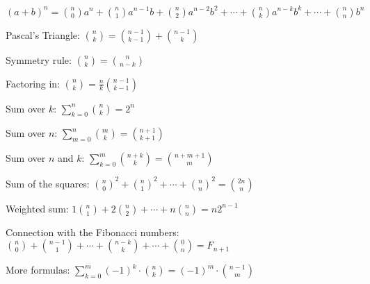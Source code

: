 $ (a+b)^n = \binom n 0 a^n + \binom n 1 a^{n-1} b + \binom n 2 a^{n-2} b^2 + \cdots + \binom n k a^{n-k} b^k + \cdots + \binom n n b^n $ 

Pascal's Triangle:
$ \binom n k = \binom {n-1} {k-1} + \binom {n-1} k $ 

Symmetry rule:
$ \binom n k = \binom n {n-k} $

Factoring in:
$ \binom n k = \frac n k \binom {n-1} {k-1} $

Sum over $k$:
$ \sum_{k = 0}^n \binom n k = 2 ^ n $

Sum over $n$:
$ \sum_{m = 0}^n \binom m k = \binom {n + 1} {k + 1} $

Sum over $n$ and $k$:
$ \sum_{k = 0}^m  \binom {n + k} k = \binom {n + m + 1} m $

Sum of the squares:
$ {\binom n 0}^2 + {\binom n 1}^2 + \cdots + {\binom n n}^2 = \binom {2n} n $

Weighted sum:
$ 1 \binom n 1 + 2 \binom n 2 + \cdots + n \binom n n = n 2^{n-1} $

Connection with the Fibonacci numbers:
$ \binom n 0 + \binom {n-1} 1 + \cdots + \binom {n-k} k + \cdots + \binom 0 n = F_{n+1} $

More formulas:
$ \sum_{k=0}^m (-1)^k \cdot \binom{n}{k} = (-1)^m \cdot \binom{n-1}{m} $